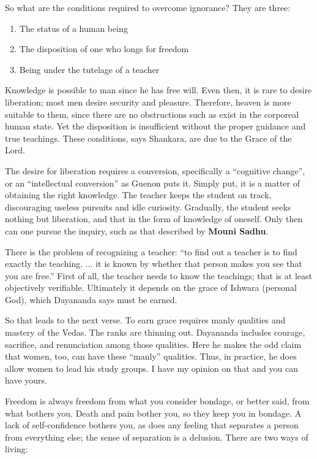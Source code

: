 So what are the conditions required to overcome ignorance? They are three:

\begin{enumerate}


\item The status of a human being

\item The disposition of one who longs for freedom

\item Being under the tutelage of a teacher
\end{enumerate}


Knowledge is possible to man since he has free will. Even then, it is rare to desire liberation; most men desire security and pleasure. Therefore, heaven is more suitable to them, since there are no obstructions such as exist in the corporeal human state. Yet the disposition is insufficient without the proper guidance and true teachings. These conditions, says Shankara, are due to the Grace of the Lord.

The desire for liberation requires a conversion, specifically a ``cognitive change'', or an ``intellectual conversion'' as Guenon puts it. Simply put, it is a matter of obtaining the right knowledge. The teacher keeps the student on track, discouraging useless pursuits and idle curiosity. Gradually, the student seeks nothing but liberation, and that in the form of knowledge of oneself. Only then can one pursue the inquiry, such as that described by \textbf{Mouni Sadhu}.

There is the problem of recognizing a teacher: ``to find out a teacher is to find exactly the teaching. ... it is known by whether that person makes you see that you are free.'' First of all, the teacher needs to know the teachings; that is at least objectively verifiable. Ultimately it depends on the grace of Ishwara (personal God), which Dayananda says must be earned.

So that leads to the next verse. To earn grace requires manly qualities and mastery of the Vedas. The ranks are thinning out. Dayananda includes courage, sacrifice, and renunciation among those qualities. Here he makes the odd claim that women, too, can have these ``manly'' qualities. Thus, in practice, he does allow women to lead his study groups. I have my opinion on that and you can have yours.

Freedom is always freedom from what you consider bondage, or better said, from what bothers you. Death and pain bother you, so they keep you in bondage. A lack of self-confidence bothers you, as does any feeling that separates a person from everything else; the sense of separation is a delusion. There are two ways of living:

